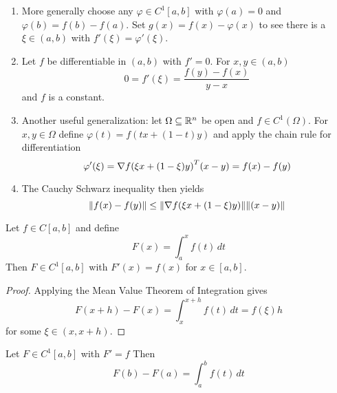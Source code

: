 \begin{remark}\hfill
    \begin{enumerate}
        \item More generally choose any \( \varphi \in C^1[a,b] \) with \( \varphi(a) = 0 \) and
              \( \varphi(b) = f(b) - f(a) \). Set \( g(x) = f(x) - \varphi(x) \) to see there is a \( \xi \in (a,b) \)
              with \( f'(\xi) = \varphi'(\xi)\).
        \item Let \( f \) be differentiable in \( (a, b) \) with \( f' = 0 \). For \( x, y \in (a, b) \)
              \[
                  0 = f'(\xi) = \frac{f(y) - f(x)}{y - x}
              \]
              and \( f \) is a constant.
        \item Another useful generalization: let \( \Omega \subseteq \mathbb{R}^n \) be open and \( f \in C^1(\Omega) \). For
              \( x, y \in \Omega \) define \( \varphi(t) = f(tx + (1 - t)y) \) and apply the chain rule for differentiation
              \[
                  \varphi'(\xi) = \nabla {f(\xi x + (1 - \xi)y)}^T(x - y) = f(x) - f(y)
              \]
        \item The Cauchy Schwarz inequality then yields
              \[
                  \|f(x) - f(y)\| \le \|\nabla f(\xi x + (1 - \xi)y)\| \|(x - y)\|
              \]
    \end{enumerate}
\end{remark}
\bigskip


\begin{theorem}\label{thm:differentiation}
    Let \( f \in C[a,b] \) and define
    \[
        F(x) = \int_a^x f(t)\,dt
    \]
    Then \( F \in C^1[a,b] \) with \( F'(x) = f(x) \) for \( x \in [a,b] \).
\end{theorem}

\begin{proof}
    Applying the Mean Value Theorem of Integration gives
    \[
        F(x + h) - F(x) =  \int_x^{x + h} f(t)\,dt = f(\xi) h
    \]
    for some \( \xi \in (x, x + h) \).
\end{proof}
\bigskip

\begin{theorem}\label{thm:fund_calculus}
    Let \( F \in C^1[a,b] \) with \( F' = f \)  Then
    \[
        F(b) -F(a) = \int_a^b f(t)\,dt
    \]
\end{theorem}
\bigskip


